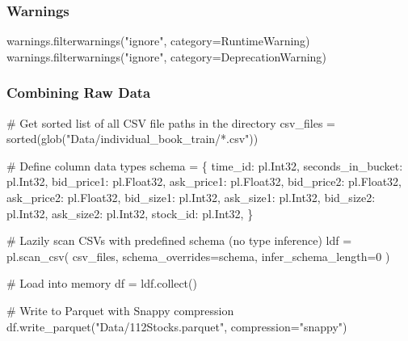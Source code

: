 \documentclass[
  letterpaper,
  DIV=11,
  numbers=noendperiod]{scrartcl}
\newenvironment{Shaded}{\begin{snugshade}}{\end{snugshade}}
\newcommand{\BuiltInTok}[1]{\textcolor[rgb]{0.00,0.23,0.31}{#1}}
\newcommand{\CommentTok}[1]{\textcolor[rgb]{0.37,0.37,0.37}{#1}}
\newcommand{\DecValTok}[1]{\textcolor[rgb]{0.68,0.00,0.00}{#1}}
\newcommand{\NormalTok}[1]{\textcolor[rgb]{0.00,0.23,0.31}{#1}}
\newcommand{\OperatorTok}[1]{\textcolor[rgb]{0.37,0.37,0.37}{#1}}
\newcommand{\PreprocessorTok}[1]{\textcolor[rgb]{0.68,0.00,0.00}{#1}}
\newcommand{\StringTok}[1]{\textcolor[rgb]{0.13,0.47,0.30}{#1}}
\begin{document}
\subsubsection{Warnings}\label{warnings}

\begin{Shaded}
\begin{Highlighting}[]
\NormalTok{warnings.filterwarnings(}\StringTok{"ignore"}\NormalTok{, category}\OperatorTok{=}\PreprocessorTok{RuntimeWarning}\NormalTok{)}
\NormalTok{warnings.filterwarnings(}\StringTok{"ignore"}\NormalTok{, category}\OperatorTok{=}\PreprocessorTok{DeprecationWarning}\NormalTok{)}
\end{Highlighting}
\end{Shaded}

\subsubsection{Combining Raw Data}\label{combining-raw-data}

\begin{Shaded}
\begin{Highlighting}[]
\CommentTok{\# Get sorted list of all CSV file paths in the directory}
\NormalTok{csv\_files }\OperatorTok{=} \BuiltInTok{sorted}\NormalTok{(glob(}\StringTok{"Data/individual\_book\_train/*.csv"}\NormalTok{))}

\CommentTok{\# Define column data types}
\NormalTok{schema }\OperatorTok{=}\NormalTok{ \{}
    \StringTok{\textquotesingle{}time\_id\textquotesingle{}}\NormalTok{: pl.Int32,}
    \StringTok{\textquotesingle{}seconds\_in\_bucket\textquotesingle{}}\NormalTok{: pl.Int32,}
    \StringTok{\textquotesingle{}bid\_price1\textquotesingle{}}\NormalTok{: pl.Float32,}
    \StringTok{\textquotesingle{}ask\_price1\textquotesingle{}}\NormalTok{: pl.Float32,}
    \StringTok{\textquotesingle{}bid\_price2\textquotesingle{}}\NormalTok{: pl.Float32,}
    \StringTok{\textquotesingle{}ask\_price2\textquotesingle{}}\NormalTok{: pl.Float32,}
    \StringTok{\textquotesingle{}bid\_size1\textquotesingle{}}\NormalTok{: pl.Int32,}
    \StringTok{\textquotesingle{}ask\_size1\textquotesingle{}}\NormalTok{: pl.Int32,}
    \StringTok{\textquotesingle{}bid\_size2\textquotesingle{}}\NormalTok{: pl.Int32,}
    \StringTok{\textquotesingle{}ask\_size2\textquotesingle{}}\NormalTok{: pl.Int32,}
    \StringTok{\textquotesingle{}stock\_id\textquotesingle{}}\NormalTok{: pl.Int32,}
\NormalTok{\}}

\CommentTok{\# Lazily scan CSVs with predefined schema (no type inference)}
\NormalTok{ldf }\OperatorTok{=}\NormalTok{ pl.scan\_csv(}
\NormalTok{    csv\_files,}
\NormalTok{    schema\_overrides}\OperatorTok{=}\NormalTok{schema,}
\NormalTok{    infer\_schema\_length}\OperatorTok{=}\DecValTok{0}  
\NormalTok{)}

\CommentTok{\# Load into memory}
\NormalTok{df }\OperatorTok{=}\NormalTok{ ldf.collect()}

\CommentTok{\# Write to Parquet with Snappy compression}
\NormalTok{df.write\_parquet(}\StringTok{"Data/112Stocks.parquet"}\NormalTok{, compression}\OperatorTok{=}\StringTok{"snappy"}\NormalTok{)}
\end{Highlighting}
\end{Shaded}
\end{document}
